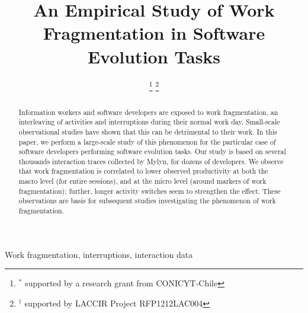 \documentclass[conference]{IEEEtran}
\begin{document}
%
\title{An Empirical Study of Work Fragmentation in Software Evolution Tasks}
%
%
%

\author{

\and
{}
\thanks{$^*$ supported by a research grant from CONICYT-Chile}
\thanks{$^{\dagger}$ supported by LACCIR Project RFP1212LAC004}
}



\maketitle


\begin{abstract}
Information workers and software developers are exposed to work fragmentation, an interleaving of activities and interruptions during their normal work day. Small-scale observational studies have shown that this can be detrimental to their work. In this paper, we perform a large-scale study of this phenomenon for the particular case of software developers performing software evolution tasks. Our study is based on several thousands interaction traces collected by Mylyn, for dozens of developers. We observe that work fragmentation is correlated to lower observed productivity at both the macro level (for entire sessions), and at the micro level (around markers of work fragmentation); further, longer activity switches seem to strengthen the effect. These observations are basis for subsequent studies investigating the phenomenon of work fragmentation.
\end{abstract}


\begin{IEEEkeywords}
Work fragmentation, interruptions, interaction data %
\end{IEEEkeywords}
\end{document}
